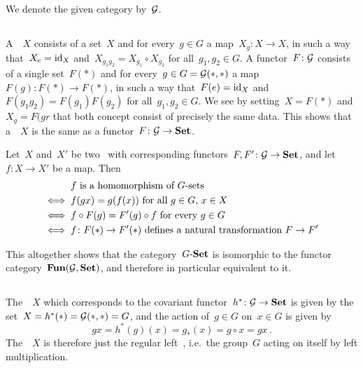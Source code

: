 \section{}

We denote the given category by~$\mathcal{G}$.





\subsection{}

A~~$X$ consists of a set~$X$ and for every~$g \in G$ a map~$X_g \colon X \to X$, in such a way that~$X_e = \operatorname{id}_X$ and~$X_{g_1 g_2} = X_{g_1} \circ X_{g_2}$ for all~$g_1, g_2 \in G$.
A functor~$F \colon \mathcal{G}$ consists of a single set~$F(\ast)$ and for every~$g \in G = \mathcal{G}(\ast,\ast)$ a map~$F(g) \colon F(\ast) \to F(\ast)$, in such a way that~$F(e) = \operatorname{id}_X$ and~$F(g_1 g_2) = F(g_1) F(g_2)$ for all~$g_1, g_2 \in G$.
We see by setting~$X = F(\ast)$ and~$X_g = F(gr$ that both concept consist of precisely the same data.
This shows that a~~$X$ is the same as a functor~$F \colon \mathcal{G} \to \mathbf{Set}$.

Let~$X$ and~$X'$ be two~ with corresponding functors~$F, F' \colon \mathcal{G} \to \mathbf{Set}$, and let~$f \colon X \to X'$ be a map.
Then
\begin{align*}
      {}& \text{$f$ is a homomorphism of~\dash{$G$}{sets}}  \\
  \iff{}& \text{$f(gx) = g(f(x))$ for all~$g \in G$,~$x \in X$} \\
  \iff{}& \text{$f \circ F(g) = F'(g) \circ f$ for every~$g \in G$} \\
  \iff{}& \text{$f \colon F(\ast) \to F'(\ast)$ defines a natural transformation~$F \to F'$}
\end{align*}

This altogether shows that the category~$\text{$G$-$\mathbf{Set}$}$ is isomorphic to the functor category~$\mathbf{Fun}(\mathcal{G}, \mathbf{Set})$, and therefore in particular equivalent to it.





\subsection{}

The~~$X$ which corresponds to the covariant functor~$h^\ast \colon \mathcal{G} \to \mathbf{Set}$ is given by the set~$X = h^\ast(\ast) = \mathcal{G}(\ast,\ast) = G$, and the action of~$g \in G$ on~$x \in G$ is given by
\[
    gx
  = h^\ast(g)(x)
  = g_*(x)
  = g \circ x
  = gx \,.
\]
The~~$X$ is therefore just the regular left~, i.e.\ the group~$G$ acting on itself by left multiplication.





